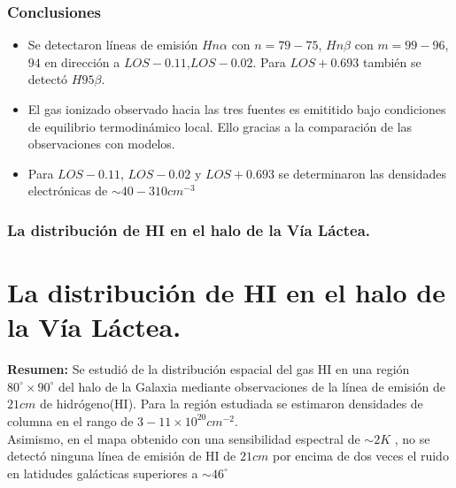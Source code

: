 \documentclass[8pt]{beamer}
\begin{document}
\begin{frame}
\frametitle{Conclusiones}
\begin{itemize}
    \item Se detectaron líneas de emisión $Hn\alpha$ con $n=79-75$, $Hn\beta$ con $m=99-96$,$94$ en dirección a $LOS-0.11$,$LOS-0.02$. Para $LOS+0.693$ también se detectó $H95\beta$. 
    \item El gas ionizado observado hacia las tres fuentes es emititido bajo condiciones de equilibrio termodinámico local. Ello gracias a la comparación de las observaciones con modelos.
    \item Para $LOS-0.11$, $LOS-0.02$ y $LOS+0.693$ se determinaron  las densidades electrónicas de $\sim 40-310cm^{-3}$
\end{itemize}
\end{frame}
\begin{frame}
\frametitle{La distribución de HI en el halo de la Vía Láctea.}
\section{La distribución de HI en el halo de la Vía Láctea.}
\textbf{Resumen:} 
Se  estudió de  la distribución espacial del gas HI en una región $80^{\circ}\times 90^{\circ}$ del halo de la Galaxia mediante observaciones de la línea de emisión de $21cm$ de hidrógeno(HI). Para la región estudiada se estimaron densidades de columna en el rango de $3-11\times 10^{20}cm^{-2}$.\\

Asimismo, en el mapa obtenido con una sensibilidad espectral de $\sim 2K$ , no se detectó ninguna línea de emisión de HI de $21cm$ por encima de dos veces el ruido en latidudes galácticas superiores a $\sim 46^{\circ}$
\end{frame}
\end{document}
